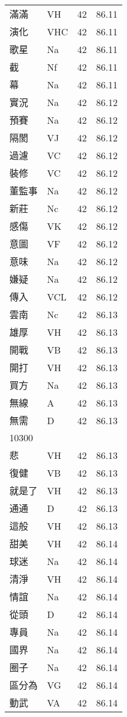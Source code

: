 \documentclass[twocolumn]{book}
\begin{document}
\begin{supertabular}{llrr}
滿滿 & VH & 42 &  86.11\\
演化 & VHC & 42 &  86.11\\
歌星 & Na & 42 &  86.11\\
截 & Nf & 42 &  86.11\\
幕 & Na & 42 &  86.11\\
實況 & Na & 42 &  86.12\\
預賽 & Na & 42 &  86.12\\
隔閡 & VJ & 42 &  86.12\\
過濾 & VC & 42 &  86.12\\
裝修 & VC & 42 &  86.12\\
董監事 & Na & 42 &  86.12\\
新莊 & Nc & 42 &  86.12\\
感傷 & VK & 42 &  86.12\\
意圖 & VF & 42 &  86.12\\
意味 & Na & 42 &  86.12\\
嫌疑 & Na & 42 &  86.12\\
傳入 & VCL & 42 &  86.12\\
雲南 & Nc & 42 &  86.13\\
雄厚 & VH & 42 &  86.13\\
開戰 & VB & 42 &  86.13\\
開打 & VH & 42 &  86.13\\
買方 & Na & 42 &  86.13\\
無線 & A & 42 &  86.13\\
無需 & D & 42 &  86.13\\
10300\\
悲 & VH & 42 &  86.13\\
復健 & VB & 42 &  86.13\\
就是了 & VH & 42 &  86.13\\
通通 & D & 42 &  86.13\\
這般 & VH & 42 &  86.13\\
甜美 & VH & 42 &  86.14\\
球迷 & Na & 42 &  86.14\\
清淨 & VH & 42 &  86.14\\
情誼 & Na & 42 &  86.14\\
從頭 & D & 42 &  86.14\\
專員 & Na & 42 &  86.14\\
國界 & Na & 42 &  86.14\\
圈子 & Na & 42 &  86.14\\
區分為 & VG & 42 &  86.14\\
動武 & VA & 42 &  86.14\\

\end{supertabular}
\end{document}
